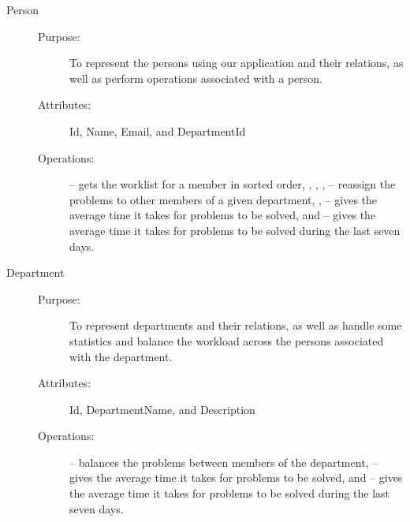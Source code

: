 \begin{description}
\item[Person]\hfill
\begin{description}
	\item[Purpose:]To represent the persons using our application and their relations, as well as perform operations associated with a person.
	\item[Attributes:]Id, Name, Email, and DepartmentId
	\item[Operations:] -- gets the worklist for a \astaff[] member in sorted order, , , ,  -- reassign the problems to other \astaff[] members of a given department, ,  -- gives the average time it takes for problems to be solved, and  -- gives the average time it takes for problems to be solved during the last seven days.
\end{description}
\end{description}

\begin{description}
\item[Department]\hfill
\begin{description}
	\item[Purpose:]To represent departments and their relations, as well as handle some statistics and balance the workload across the persons associated with the department.
	\item[Attributes:]Id, DepartmentName, and Description
	\item[Operations:] -- balances the problems between \astaff[] members of the department,  -- gives the average time it takes for problems to be solved, and  -- gives the average time it takes for problems to be solved during the last seven days.
\end{description}
\end{description}

